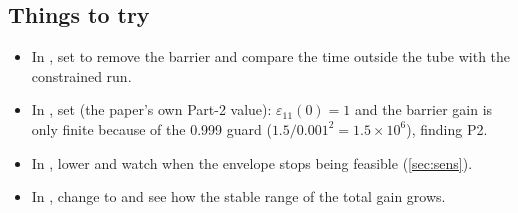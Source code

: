 
\subsection{Things to try}

\begin{itemize}[leftmargin=*]
  \item In , set  to remove the barrier and compare the time outside the tube
        with the constrained run.
  \item In , set  (the paper's own Part-2 value): $\varepsilon_{11}(0)=1$ and the barrier gain is
        only finite because of the 0.999 guard ($1.5/0.001^2=1.5\times10^6$), finding P2.
  \item In , lower  and watch when the envelope stops being feasible (\cref{sec:sens}).
  \item In , change  to  and see how the stable range of the total gain grows.
\end{itemize}
